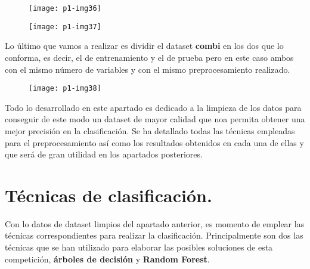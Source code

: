 \documentclass[10pt]{article}
\begin{document}
\begin{figure}[H]
	\begin{center}
 		\texttt{[image: p1-img36]}
	\end{center} 
\end{figure}   
 
\begin{figure}[H]
	\begin{center}
 		\texttt{[image: p1-img37]}
	\end{center} 
\end{figure}  
 
 
Lo último que vamos a realizar es dividir el dataset \textbf{combi} en los dos que lo conforma, es decir, el de entrenamiento y el de prueba pero en este caso ambos con el mismo número de variables y con el mismo preprocesamiento realizado.\\

\begin{figure}[H]
	\begin{center}
 		\texttt{[image: p1-img38]}
	\end{center} 
\end{figure}  
 
Todo lo desarrollado en este apartado es dedicado a la limpieza de los datos para conseguir de este modo un dataset de mayor calidad que noa permita obtener una mejor precisión en la clasificación. Se ha detallado todas las técnicas empleadas para el preprocesamiento así como los resultados obtenidos en cada una de ellas y que será de gran utilidad en los apartados posteriores.


\section{Técnicas de clasificación.} 

Con lo datos de dataset limpios del apartado anterior, es momento de emplear las técnicas correspondientes para realizar la clasificación. Principalmente son dos las técnicas que se han utilizado para elaborar las posibles soluciones de esta competición, \textbf{árboles de decisión} y \textbf{Random Forest}. \\
\end{document}
